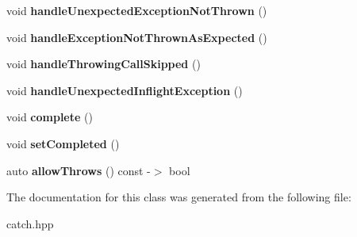 \begin{DoxyCompactItemize}
void {\bfseries handle\+Unexpected\+Exception\+Not\+Thrown} ()
\item 
\mbox{\label{classCatch_1_1AssertionHandler_a51e4936e3af43b74690cedae6d2e297a}} 
void {\bfseries handle\+Exception\+Not\+Thrown\+As\+Expected} ()
\item 
\mbox{\label{classCatch_1_1AssertionHandler_a67a194d5518f307c4a16faa03a7f7442}} 
void {\bfseries handle\+Throwing\+Call\+Skipped} ()
\item 
\mbox{\label{classCatch_1_1AssertionHandler_aa2504dad6a91f3645e5f52c932c11270}} 
void {\bfseries handle\+Unexpected\+Inflight\+Exception} ()
\item 
\mbox{\label{classCatch_1_1AssertionHandler_a878a9eb828d8a1863c8dcb6575f6f40e}} 
void {\bfseries complete} ()
\item 
\mbox{\label{classCatch_1_1AssertionHandler_a6756bd5395c0ddd28764a9fb4612d5e4}} 
void {\bfseries set\+Completed} ()
\item 
\mbox{\label{classCatch_1_1AssertionHandler_a193bb3999494c46457f3059184c6b251}} 
auto {\bfseries allow\+Throws} () const -\/$>$ bool
\end{DoxyCompactItemize}


The documentation for this class was generated from the following file\+:\begin{DoxyCompactItemize}
\item 
catch.\+hpp\end{DoxyCompactItemize}
